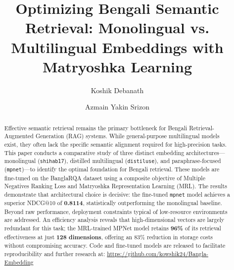 \documentclass[acmsmall,screen,review]{acmart}
\begin{document}
\title{Optimizing Bengali Semantic Retrieval: Monolingual vs. Multilingual Embeddings with Matryoshka Learning}


\author{Koshik Debanath}

\author{Azmain Yakin Srizon}

\renewcommand{\shortauthors}{Debanath and Srizon}

\begin{abstract}
Effective semantic retrieval remains the primary bottleneck for Bengali Retrieval-Augmented Generation (RAG) systems. While general-purpose multilingual models exist, they often lack the specific semantic alignment required for high-precision tasks. This paper conducts a comparative study of three distinct embedding architectures—monolingual (\texttt{shihab17}), distilled multilingual (\texttt{distiluse}), and paraphrase-focused (\texttt{mpnet})—to identify the optimal foundation for Bengali retrieval. These models are fine-tuned on the BanglaRQA dataset using a composite objective of Multiple Negatives Ranking Loss and Matryoshka Representation Learning (MRL). The results demonstrate that architectural choice is decisive: the fine-tuned \texttt{mpnet} model achieves a superior NDCG@10 of \textbf{0.8114}, statistically outperforming the monolingual baseline. Beyond raw performance, deployment constraints typical of low-resource environments are addressed. An efficiency analysis reveals that high-dimensional vectors are largely redundant for this task; the MRL-trained MPNet model retains \textbf{96\%} of its retrieval effectiveness at just \textbf{128 dimensions}, offering an 83\% reduction in storage costs without compromising accuracy. Code and fine-tuned models are released to facilitate reproducibility and further research at: \url{https://github.com/kowshik24/Bangla-Embedding}
\end{abstract}
\end{document}
